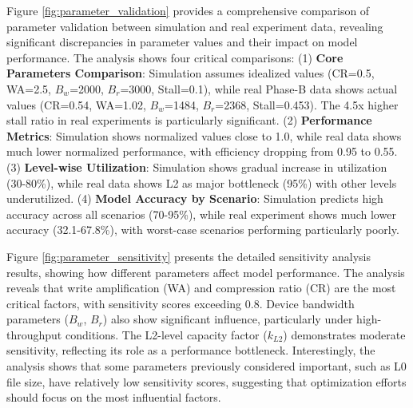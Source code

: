 \documentclass[11pt]{article}
\begin{document}
Figure \ref{fig:parameter_validation} provides a comprehensive comparison of parameter validation between simulation and real experiment data, revealing significant discrepancies in parameter values and their impact on model performance. The analysis shows four critical comparisons: (1) \textbf{Core Parameters Comparison}: Simulation assumes idealized values (CR=0.5, WA=2.5, $B_w$=2000, $B_r$=3000, Stall=0.1), while real Phase-B data shows actual values (CR=0.54, WA=1.02, $B_w$=1484, $B_r$=2368, Stall=0.453). The 4.5x higher stall ratio in real experiments is particularly significant. (2) \textbf{Performance Metrics}: Simulation shows normalized values close to 1.0, while real data shows much lower normalized performance, with efficiency dropping from 0.95 to 0.55. (3) \textbf{Level-wise Utilization}: Simulation shows gradual increase in utilization (30-80\%), while real data shows L2 as major bottleneck (95\%) with other levels underutilized. (4) \textbf{Model Accuracy by Scenario}: Simulation predicts high accuracy across all scenarios (70-95\%), while real experiment shows much lower accuracy (32.1-67.8\%), with worst-case scenarios performing particularly poorly.

Figure \ref{fig:parameter_sensitivity} presents the detailed sensitivity analysis results, showing how different parameters affect model performance. The analysis reveals that write amplification (WA) and compression ratio (CR) are the most critical factors, with sensitivity scores exceeding 0.8. Device bandwidth parameters ($B_w$, $B_r$) also show significant influence, particularly under high-throughput conditions. The L2-level capacity factor ($k_{L2}$) demonstrates moderate sensitivity, reflecting its role as a performance bottleneck. Interestingly, the analysis shows that some parameters previously considered important, such as L0 file size, have relatively low sensitivity scores, suggesting that optimization efforts should focus on the most influential factors.
\end{document}
